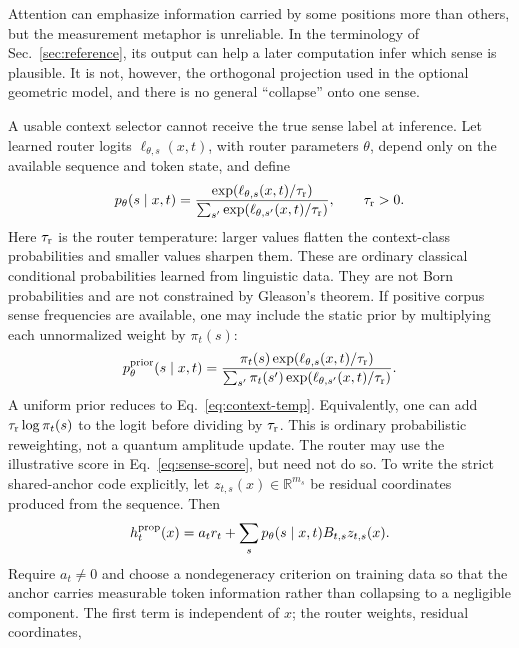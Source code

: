 \documentclass[
  aps,
  reprint,
  superscriptaddress,
  floatfix,
  nofootinbib,
  longbibliography
]{revtex4-2}
\newcommand{\R}{\mathbb{R}}
\begin{document}
Attention can emphasize information carried by some positions more than
others, but the measurement metaphor is unreliable.  In the terminology of
Sec.~\ref{sec:reference}, its output can help a later computation infer which
sense is plausible.  It is not, however, the orthogonal projection used in the
optional geometric model, and there is no general ``collapse'' onto one sense.

A usable context selector cannot receive the true sense label at inference.
Let learned router logits $\ell_{\theta,s}(x,t)$, with router parameters
$\theta$, depend only on the available
sequence and token state, and define
%
\begin{equation}
\label{eq:context-temp}
p_\theta(s\mid x,t)=
\frac{\exp(\ell_{\theta,s}(x,t)/\tau_{\rm r})}
{\sum_{s'}\exp(\ell_{\theta,s'}(x,t)/\tau_{\rm r})},
\qquad \tau_{\rm r}>0 .
\end{equation}
%
Here $\tau_{\rm r}$ is the router temperature: larger values flatten the
context-class probabilities and smaller values sharpen them.  These are ordinary
classical conditional probabilities learned from linguistic data.  They are
not Born probabilities and are not constrained by Gleason's theorem.
If positive corpus sense frequencies are available, one may include the static
prior by multiplying each unnormalized weight by $\pi_t(s)$:
%
\begin{equation}
\label{eq:context-with-prior}
p_\theta^{\rm prior}(s\mid x,t)=
\frac{\pi_t(s)\exp(\ell_{\theta,s}(x,t)/\tau_{\rm r})}
{\sum_{s'}\pi_t(s')\exp(\ell_{\theta,s'}(x,t)/\tau_{\rm r})}.
\end{equation}
%
A uniform prior reduces to Eq.~\eqref{eq:context-temp}.  Equivalently, one can
add $\tau_{\rm r}\log\pi_t(s)$ to the logit before dividing by
$\tau_{\rm r}$.  This is ordinary probabilistic reweighting, not a quantum
amplitude update.
The router may use the illustrative score in Eq.~\eqref{eq:sense-score}, but
need not do so.  To write the strict shared-anchor code explicitly, let
$z_{t,s}(x)\in\R^{m_s}$ be residual coordinates produced from the sequence.
Then
%
\begin{equation}
\label{eq:shared-anchor-code}
h_t^{\rm prop}(x)=a_t r_t+
\sum_s p_\theta(s\mid x,t)B_{t,s}z_{t,s}(x).
\end{equation}
%
Require $a_t\ne0$ and choose a nondegeneracy criterion on training data so that
the anchor carries measurable token information rather than collapsing to a
negligible component.  The first term is independent of $x$; the router weights, residual coordinates,
\end{document}

